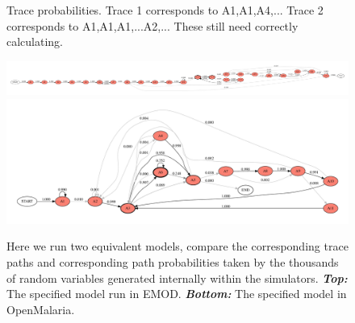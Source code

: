 \documentclass{article}
\begin{document}
\begin{figure}
\caption{Trace probabilities. Trace 1 corresponds to A1,A1,A4,... 
Trace 2 corresponds to A1,A1,A1,...A2,... These still need correctly calculating.}
\end{figure}
\begin{figure}[h!]
	\centering
	\includegraphics[width=\textwidth]{../plots/emod_24_prior_pop_100.pdf}
	\includegraphics[width=\textwidth]{../plots/ewan_25_pop_100.pdf}
	\caption{Here we run two equivalent models, compare the corresponding trace paths and corresponding 
	path probabilities taken by the thousands of random variables generated internally within the simulators. \textit{\textbf{Top:}} The specified model run in EMOD. \textit{\textbf{Bottom:}} The specified model in OpenMalaria.}
	\label{fig:plotewan}
\end{figure}
\end{document}
